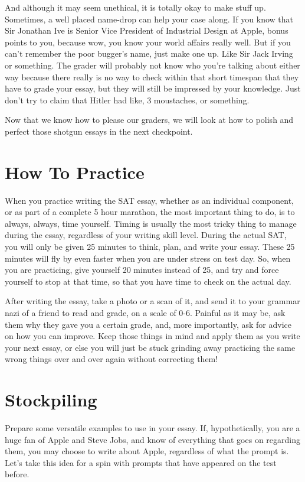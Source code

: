 \documentclass[DIV=calc,11pt,parskip,numbers=noenddot]{scrartcl} %
\begin{document}
And although it may seem unethical, it is totally okay to make stuff up. Sometimes, a well placed name-drop can help your case along. If you know that Sir Jonathan Ive is Senior Vice President of Industrial Design at Apple, bonus points to you, because wow, you know your world affairs really well. But if you can’t remember the poor bugger’s name, just make one up. Like Sir Jack Irving or something. The grader will probably not know who you’re talking about either way because there really is no way to check within that short timespan that they have to grade your essay, but they will still be impressed by your knowledge. Just don’t try to claim that Hitler had like, 3 moustaches, or something.

Now that we know how to please our graders, we will look at how to polish and perfect those shotgun essays in the next checkpoint.
\section{How To Practice}
When you practice writing the SAT essay, whether as an individual component, or as part of a complete 5 hour marathon, the most important thing to do, is to always, always, time yourself. Timing is usually the most tricky thing to manage during the essay, regardless of your writing skill level. During the actual SAT, you will only be given 25 minutes to think, plan, and write your essay. These 25 minutes will fly by even faster when you are under stress on test day. So, when you are practicing, give yourself 20 minutes instead of 25, and try and force yourself to stop at that time, so that you have time to check on the actual day.

After writing the essay, take a photo or a scan of it, and send it to your grammar nazi of a friend to read and grade, on a scale of 0-6. Painful as it may be, ask them why they gave you a certain grade, and, more importantly, ask for advice on how you can improve. Keep those things in mind and apply them as you write your next essay, or else you will just be stuck grinding away practicing the same wrong things over and over again without correcting them!
\section{Stockpiling}
Prepare some versatile examples to use in your essay. If, hypothetically, you are a huge fan of Apple and Steve Jobs, and know of everything that goes on regarding them, you may choose to write about Apple, regardless of what the prompt is. Let’s take this idea for a spin with prompts that have appeared on the test before.
\end{document}
